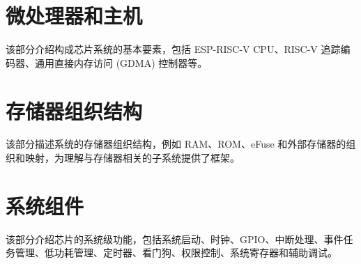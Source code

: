 \documentclass[openany, 10pt]{book}
\begin{document}
\setchineseformatting




\clearpage

\clearpage


\tableofcontents
\clearpage
\listoftables
\clearpage
\listoffigures







\part{微处理器和主机}


该部分介绍构成芯片系统的基本要素，包括 ESP-RISC-V CPU、RISC-V 追踪编码器、通用直接内存访问 (GDMA) 控制器等。


\part{存储器组织结构}

该部分描述系统的存储器组织结构，例如 RAM、ROM、eFuse 和外部存储器的组织和映射，为理解与存储器相关的子系统提供了框架。


\part{系统组件}


该部分介绍芯片的系统级功能，包括系统启动、时钟、GPIO、中断处理、事件任务管理、低功耗管理、定时器、看门狗、权限控制、系统寄存器和辅助调试。
\end{document}
